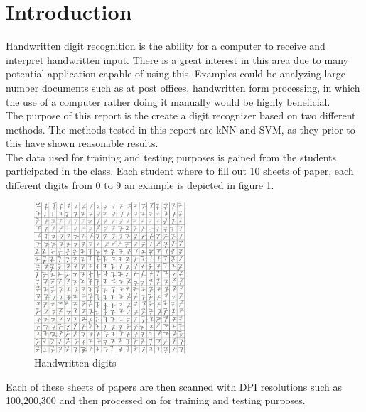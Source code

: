 \section{Introduction}
Handwritten digit recognition is the ability for a computer to receive and interpret handwritten input. There is a great interest in this area due to many potential application capable of using this. Examples could be analyzing large number documents such as at post offices, handwritten form processing, in which the use of a computer rather doing it manually would be highly beneficial.  \\

The purpose of this report is the create a digit recognizer based on two different methods.  The methods tested in this report are kNN and SVM, as they prior to this have shown reasonable results.\\

The data used for training and testing purposes is gained from the students participated in the class.  Each student where to fill out 10 sheets of paper, each different digits from 0 to 9 an example is depicted in figure \ref{fig:handwriten_digits}. 

\begin{figure}[H]
\centering
\includegraphics[width = 0.5\textwidth]{img/cropY2016G2M1-100-7.png}
\caption{Handwritten digits}
\label{fig:handwriten_digits}
\end{figure}

Each of these sheets of papers are then scanned with DPI resolutions such as 100,200,300 and then processed on for training and testing purposes. 
\newpage
